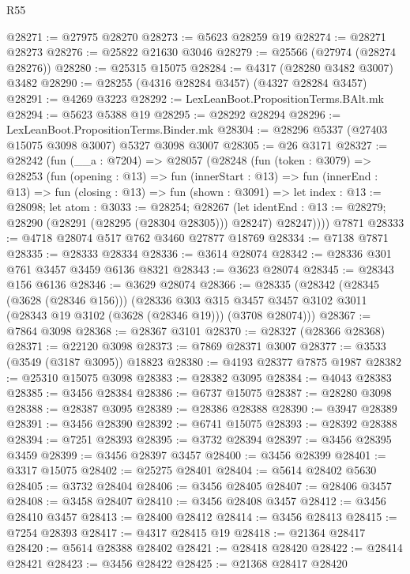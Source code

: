 \begin{lexlean}{R55}
\begin{coremodule}
@28271 := @27975 @28270
@28273 := @5623 @28259 @19
@28274 := @28271 @28273
@28276 := @25822 @21630 @3046
@28279 := @25566 (@27974 (@28274 @28276))
@28280 := @25315 @15075
@28284 := @4317 (@28280 @3482 @3007) @3482
@28290 := @28255 (@4316 @28284 @3457) (@4327 @28284 @3457)
@28291 := @4269 @3223
@28292 := LexLeanBoot.PropositionTerms.BAlt.mk
@28294 := @5623 @5388 @19
@28295 := @28292 @28294
@28296 := LexLeanBoot.PropositionTerms.Binder.mk
@28304 := @28296 @5337 (@27403 @15075 @3098 @3007) @5327 @3098 @3007
@28305 := @26 @3171
@28327 := @28242
    (fun (__a : @7204) =>
    @28057
      (@28248
        (fun (token : @3079) =>
        @28253
          (fun (opening : @13) =>
          fun (innerStart : @13) =>
          fun (innerEnd : @13) =>
          fun (closing : @13) =>
          fun (shown : @3091) =>
          let index : @13 := @28098;
          let atom : @3033 := @28254;
          @28267
            (let identEnd : @13 := @28279; @28290 (@28291 (@28295 (@28304 @28305))) @28247)
            @28247))))
    @7871
@28333 := @4718 @28074 @517 @762 @3460 @27877 @18769
@28334 := @7138 @7871
@28335 := @28333 @28334
@28336 := @3614 @28074
@28342 := @28336 @301 @761 @3457 @3459 @6136 @8321
@28343 := @3623 @28074
@28345 := @28343 @156 @6136
@28346 := @3629 @28074
@28366 := @28335
    (@28342
      (@28345 (@3628 (@28346 @156)))
      (@28336
        @303
        @315
        @3457
        @3457
        @3102
        @3011
        (@28343 @19 @3102 (@3628 (@28346 @19)))
        (@3708 @28074)))
@28367 := @7864 @3098
@28368 := @28367 @3101
@28370 := @28327 (@28366 @28368)
@28371 := @22120 @3098
@28373 := @7869 @28371 @3007
@28377 := @3533 (@3549 (@3187 @3095)) @18823
@28380 := @4193 @28377 @7875 @1987
@28382 := @25310 @15075 @3098
@28383 := @28382 @3095
@28384 := @4043 @28383
@28385 := @3456 @28384
@28386 := @6737 @15075
@28387 := @28280 @3098
@28388 := @28387 @3095
@28389 := @28386 @28388
@28390 := @3947 @28389
@28391 := @3456 @28390
@28392 := @6741 @15075
@28393 := @28392 @28388
@28394 := @7251 @28393
@28395 := @3732 @28394
@28397 := @3456 @28395 @3459
@28399 := @3456 @28397 @3457
@28400 := @3456 @28399
@28401 := @3317 @15075
@28402 := @25275 @28401
@28404 := @5614 @28402 @5630
@28405 := @3732 @28404
@28406 := @3456 @28405
@28407 := @28406 @3457
@28408 := @3458 @28407
@28410 := @3456 @28408 @3457
@28412 := @3456 @28410 @3457
@28413 := @28400 @28412
@28414 := @3456 @28413
@28415 := @7254 @28393
@28417 := @4317 @28415 @19
@28418 := @21364 @28417
@28420 := @5614 @28388 @28402
@28421 := @28418 @28420
@28422 := @28414 @28421
@28423 := @3456 @28422
@28425 := @21368 @28417 @28420

\end{coremodule}
\end{lexlean}
